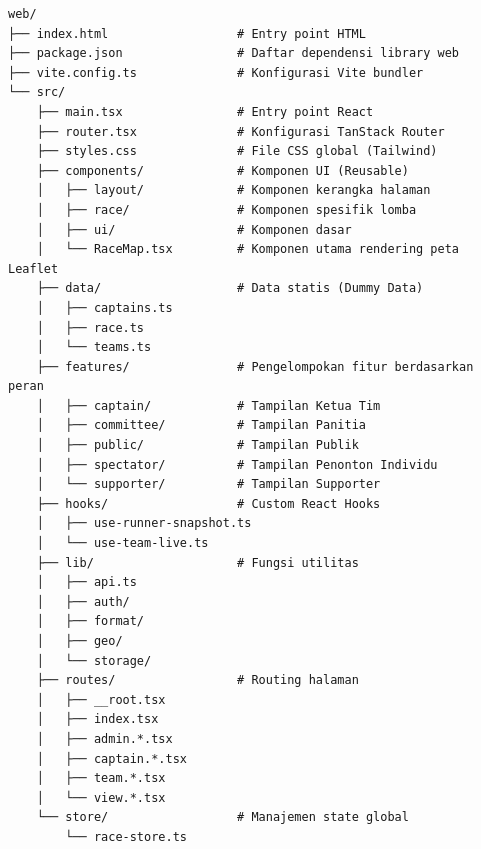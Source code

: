 \begin{lstlisting}[language={},caption={Struktur Direktori Aplikasi Web ITB Ultra-Marathon},label={lst:struktur-web}]
web/
├── index.html                  # Entry point HTML
├── package.json                # Daftar dependensi library web
├── vite.config.ts              # Konfigurasi Vite bundler
└── src/
    ├── main.tsx                # Entry point React
    ├── router.tsx              # Konfigurasi TanStack Router
    ├── styles.css              # File CSS global (Tailwind)
    ├── components/             # Komponen UI (Reusable)
    │   ├── layout/             # Komponen kerangka halaman 
    │   ├── race/               # Komponen spesifik lomba 
    │   ├── ui/                 # Komponen dasar 
    │   └── RaceMap.tsx         # Komponen utama rendering peta Leaflet
    ├── data/                   # Data statis (Dummy Data)
    │   ├── captains.ts
    │   ├── race.ts
    │   └── teams.ts
    ├── features/               # Pengelompokan fitur berdasarkan peran
    │   ├── captain/            # Tampilan Ketua Tim
    │   ├── committee/          # Tampilan Panitia
    │   ├── public/             # Tampilan Publik
    │   ├── spectator/          # Tampilan Penonton Individu
    │   └── supporter/          # Tampilan Supporter
    ├── hooks/                  # Custom React Hooks
    │   ├── use-runner-snapshot.ts
    │   └── use-team-live.ts
    ├── lib/                    # Fungsi utilitas
    │   ├── api.ts
    │   ├── auth/
    │   ├── format/
    │   ├── geo/
    │   └── storage/
    ├── routes/                 # Routing halaman
    │   ├── __root.tsx
    │   ├── index.tsx
    │   ├── admin.*.tsx
    │   ├── captain.*.tsx
    │   ├── team.*.tsx
    │   └── view.*.tsx
    └── store/                  # Manajemen state global
        └── race-store.ts
\end{lstlisting}